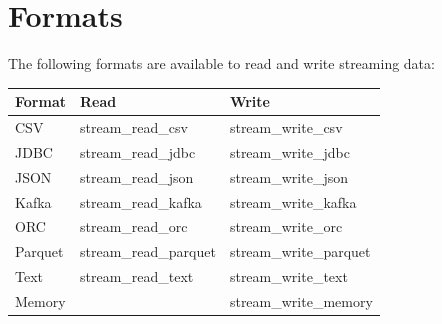 \documentclass[]{book}
\newenvironment{Shaded}{\begin{snugshade}}{\end{snugshade}}
\newcommand{\ControlFlowTok}[1]{\textcolor[rgb]{0.13,0.29,0.53}{\textbf{#1}}}
\newcommand{\DataTypeTok}[1]{\textcolor[rgb]{0.13,0.29,0.53}{#1}}
\newcommand{\KeywordTok}[1]{\textcolor[rgb]{0.13,0.29,0.53}{\textbf{#1}}}
\newcommand{\NormalTok}[1]{#1}
\newcommand{\OperatorTok}[1]{\textcolor[rgb]{0.81,0.36,0.00}{\textbf{#1}}}
\newcommand{\StringTok}[1]{\textcolor[rgb]{0.31,0.60,0.02}{#1}}
\theoremstyle{definition}
\theoremstyle{definition}
\theoremstyle{definition}
\theoremstyle{remark}
\begin{document}
\begin{Shaded}
\end{Shaded}

\hypertarget{formats}{%
\section{Formats}\label{formats}}

The following formats are available to read and write streaming data:

\begin{longtable}[]{@{}lll@{}}
\toprule
Format & Read & Write\tabularnewline
\midrule
\endhead
CSV & stream\_read\_csv & stream\_write\_csv\tabularnewline
JDBC & stream\_read\_jdbc & stream\_write\_jdbc\tabularnewline
JSON & stream\_read\_json & stream\_write\_json\tabularnewline
Kafka & stream\_read\_kafka & stream\_write\_kafka\tabularnewline
ORC & stream\_read\_orc & stream\_write\_orc\tabularnewline
Parquet & stream\_read\_parquet & stream\_write\_parquet\tabularnewline
Text & stream\_read\_text & stream\_write\_text\tabularnewline
Memory & & stream\_write\_memory\tabularnewline
\bottomrule
\end{longtable}
\end{document}
